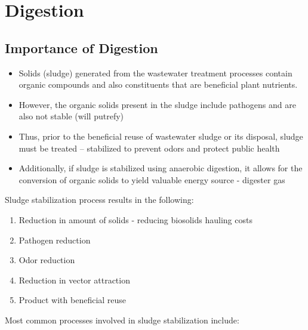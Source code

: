 



\chapter{Digestion}


\section{Importance of Digestion}

		\begin{itemize}
		\item Solids (sludge) generated from the wastewater treatment processes contain organic compounds and also constituents that are beneficial plant nutrients. 
		\item However, the organic solids present in the sludge include pathogens and are also not stable (will putrefy)
		\item Thus, prior to the beneficial reuse of wastewater sludge or its disposal, sludge must be treated – stabilized to prevent odors and protect public health
		\item Additionally, if sludge is stabilized using anaerobic digestion, it  allows for the conversion of organic solids to yield valuable energy source - digester gas
		\end{itemize}
Sludge stabilization process results in the following:
		\begin{enumerate}
		\item Reduction in amount of solids - reducing biosolids hauling costs
		\item Pathogen reduction
		\item Odor reduction
		\item Reduction in vector attraction
		\item Product with beneficial reuse
		\end{enumerate}

Most common processes involved in sludge stabilization include:

